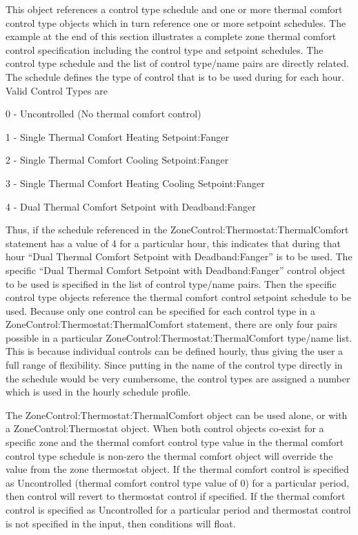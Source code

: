 This object references a control type schedule and one or more thermal comfort control type objects which in turn reference one or more setpoint schedules. The example at the end of this section illustrates a complete zone thermal comfort control specification including the control type and setpoint schedules. The control type schedule and the list of control type/name pairs are directly related. The schedule defines the type of control that is to be used during for each hour. Valid Control Types are

0 - Uncontrolled (No thermal comfort control)

1 - Single Thermal Comfort Heating Setpoint:Fanger

2 - Single Thermal Comfort Cooling Setpoint:Fanger

3 - Single Thermal Comfort Heating Cooling Setpoint:Fanger

4 - Dual Thermal Comfort Setpoint with Deadband:Fanger

Thus, if the schedule referenced in the ZoneControl:Thermostat:ThermalComfort statement has a value of 4 for a particular hour, this indicates that during that hour ``Dual Thermal Comfort Setpoint with Deadband:Fanger'' is to be used. The specific ``Dual Thermal Comfort Setpoint with Deadband:Fanger'' control object to be used is specified in the list of control type/name pairs. Then the specific control type objects reference the thermal comfort control setpoint schedule to be used. Because only one control can be specified for each control type in a ZoneControl:Thermostat:ThermalComfort statement, there are only four pairs possible in a particular ZoneControl:Thermostat:ThermalComfort type/name list. This is because individual controls can be defined hourly, thus giving the user a full range of flexibility. Since putting in the name of the control type directly in the schedule would be very cumbersome, the control types are assigned a number which is used in the hourly schedule profile.

The ZoneControl:Thermostat:ThermalComfort object can be used alone, or with a ZoneControl:Thermostat object. When both control objects co-exist for a specific zone and the thermal comfort control type value in the thermal comfort control type schedule is non-zero the thermal comfort object will override the value from the zone thermostat object. If the thermal comfort control is specified as Uncontrolled (thermal comfort control type value of 0) for a particular period, then control will revert to thermostat control if specified. If the thermal comfort control is specified as Uncontrolled for a particular period and thermostat control is not specified in the input, then conditions will float.

